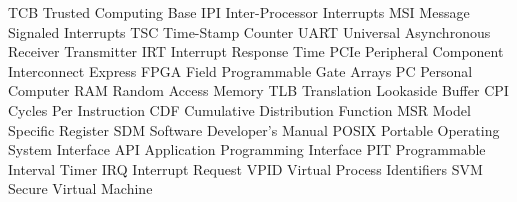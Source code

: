  {TCB} {Trusted Computing Base}
 {IPI} {Inter-Processor Interrupts}
 {MSI} {Message Signaled Interrupts}
 {TSC} {Time-Stamp Counter}
 {UART} {Universal Asynchronous Receiver Transmitter}
 {IRT} {Interrupt Response Time}
 {PCIe} {Peripheral Component Interconnect Express}
 {FPGA} {Field Programmable Gate Arrays}
 {PC} {Personal Computer}
 {RAM} {Random Access Memory}
 {TLB} {Translation Lookaside Buffer}
 {CPI} {Cycles Per Instruction}
 {CDF} {Cumulative Distribution Function}
 {MSR} {Model Specific Register}
 {SDM} {Software Developer's Manual}
 {POSIX} {Portable Operating System Interface}
 {API} {Application Programming Interface}
 {PIT} {Programmable Interval Timer}
 {IRQ} {Interrupt Request}
 {VPID} {Virtual Process Identifiers}
 {SVM} {Secure Virtual Machine}
